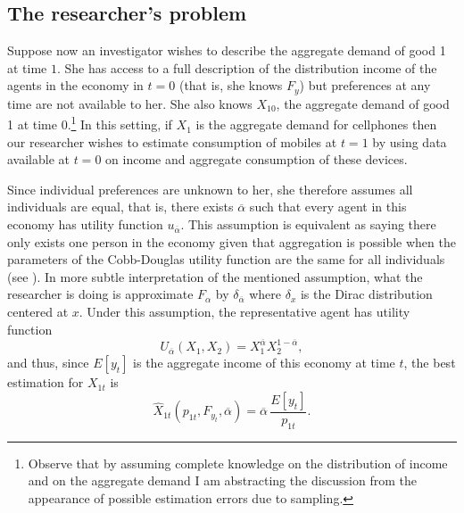 \documentclass[english, a4paper,12pt]{article}
\begin{document}
\subsection{The researcher's problem}
Suppose now an investigator wishes to describe the aggregate demand of good 1 at time $1$. She has access to a full description of the distribution income of the agents in the economy in $t = 0$ (that is, she knows $F_{y}$) but preferences at any time are not available to her. She also knows $X_{10}$, the aggregate demand of good 1 at time $0$.\footnote{Observe that by assuming complete knowledge on the distribution of income and on the aggregate demand I am abstracting the discussion from the appearance of possible estimation errors due to sampling.} In this setting, if $X_{1}$ is the aggregate demand for cellphones then our researcher wishes to estimate consumption of mobiles at $t=1$ by using data available at $t=0$ on income and aggregate consumption of these devices.

Since individual preferences are unknown to her, she therefore assumes all individuals are equal, that is, there exists $\overline{\alpha}$ such that every agent in this economy has utility function $u_{\overline{\alpha}}$. This assumption is equivalent as saying there only exists one person in the economy given that aggregation is possible when the parameters of the Cobb-Douglas utility function are the same for all individuals (see ). In more subtle interpretation of the mentioned assumption, what the researcher is doing is approximate $F_{\alpha}$ by $\delta_{\overline{\alpha}}$ where $\delta_{x}$ is the Dirac distribution centered at $x$. Under this assumption, the representative agent has utility function
	$$U_{\overline{\alpha}}(X_{1}, X_{2}) = X_{1}^{\overline{\alpha}}X_{2}^{1-\overline{\alpha}},$$
and thus, since $E[y_{t}]$ is the aggregate income of this economy at time $t$, the best estimation for $X_{1t}$ is
	$$\widehat{X}_{1t}(p_{1t}, F_{y_{t}}, \overline{\alpha}) = \overline{\alpha}\, \frac{E[y_{t}]}{p_{1t}}.$$

\end{document}
